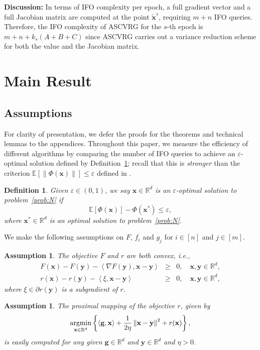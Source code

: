 \documentclass[11pt]{article}
\newtheorem{definition}{Definition}[section]
\newtheorem{assumption}[theorem]{Assumption}
\newcommand{\BE}{\mathbb{E}}
\newcommand{\x}{\mathbf x}
\newcommand{\y}{\mathbf y}
\newcommand{\g}{\mathbf g}
\newcommand{\argmin}{\mathop{\rm argmin}}
\newcommand{\br}{\mathbb{R}}
\begin{document}
\textbf{Discussion:} In terms of IFO complexity per epoch, a full gradient vector and a full Jacobian matrix are computed at the point $\tilde{\x}^s$, requiring $m+n$ IFO queries. Therefore, the IFO complexity of ASCVRG for the $s$-th epoch is $m+n+k_s\left(A+B+C\right)$ since ASCVRG carries out a variance reduction scheme for both the value and the Jacobian matrix.

\section{Main Result}\label{sec:result}
\subsection{Assumptions}
For clarity of presentation, we defer the proofs for the theorems and technical lemmas to the appendices. Throughout this paper, we measure the efficiency of different algorithms by comparing the number of IFO queries to achieve an $\varepsilon$-optimal solution defined by Definition~\ref{Definition:eps-optimal}; recall that this is \textit{stronger} than the criterion $\BE\left[ \left\|\Phi(\x)\right\|\right] \leq \varepsilon$ defined in \cite{Huo-2017-Accelerated}. 
\begin{definition}\label{Definition:eps-optimal}
Given $\varepsilon\in\left(0,1\right)$, we say $\x\in\br^d$ is an $\varepsilon$-optimal solution to problem~\eqref{prob:N} if
\begin{equation*}
\BE\left[ \Phi(\x)\right] - \Phi(\x^*) \leq \varepsilon,
\end{equation*}
where $\x^*\in\br^d$ is an optimal solution to problem~\eqref{prob:N}. 
\end{definition}
We make the following assumptions on $F$, $f_i$ and $g_j$ for $i\in\left[n\right]$ and $j\in\left[m\right]$. 
\begin{assumption}\label{Assumption:Objective-Convex-Main}
The objective $F$ and $r$ are both convex, i.e., 
\begin{eqnarray*}
F(\x) - F(\y) - \left\langle \nabla F(\y), \x-\y\right\rangle & \geq & 0, \quad \x, \y \in \br^d, \\ 
r(\x) - r(\y) - \left\langle\xi, \x-\y\right\rangle & \geq & 0, \quad \x, \y \in \br^d, 
\end{eqnarray*}
where $\xi\in\partial r(\y)$ is a subgradient of $r$.  
\end{assumption}
\begin{assumption}
The proximal mapping of the objective $r$, given by
\begin{eqnarray*}
\argmin_{\x\in\br^d}\left\{ \left\langle \g, \x\right\rangle + \frac{1}{2\eta}\left\| \x - \y\right\|^2 + r(\x)\right\}, 
\end{eqnarray*}
is easily computed for any given $\g\in\br^d$ and $\y\in\br^d$ and $\eta>0$. 
\end{assumption}
\end{document}
